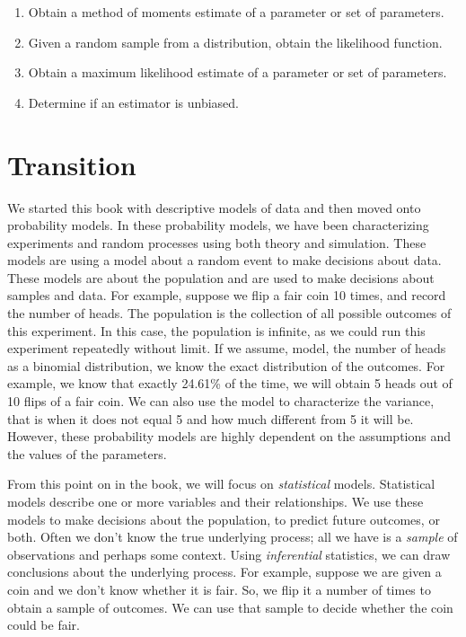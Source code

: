\documentclass[
  letterpaper,
  DIV=11,
  numbers=noendperiod]{scrreprt}
\providecommand{\tightlist}{%
  \setlength{\itemsep}{0pt}\setlength{\parskip}{0pt}}\usepackage{longtable,booktabs,array}
\begin{document}
\begin{enumerate}
\def\labelenumi{\arabic{enumi})}
\tightlist
\item
  Obtain a method of moments estimate of a parameter or set of
  parameters.\\
\item
  Given a random sample from a distribution, obtain the likelihood
  function.\\
\item
  Obtain a maximum likelihood estimate of a parameter or set of
  parameters.\\
\item
  Determine if an estimator is unbiased.
\end{enumerate}

\section{Transition}\label{transition}

We started this book with descriptive models of data and then moved onto
probability models. In these probability models, we have been
characterizing experiments and random processes using both theory and
simulation. These models are using a model about a random event to make
decisions about data. These models are about the population and are used
to make decisions about samples and data. For example, suppose we flip a
fair coin 10 times, and record the number of heads. The population is
the collection of all possible outcomes of this experiment. In this
case, the population is infinite, as we could run this experiment
repeatedly without limit. If we assume, model, the number of heads as a
binomial distribution, we know the exact distribution of the outcomes.
For example, we know that exactly 24.61\% of the time, we will obtain 5
heads out of 10 flips of a fair coin. We can also use the model to
characterize the variance, that is when it does not equal 5 and how much
different from 5 it will be. However, these probability models are
highly dependent on the assumptions and the values of the parameters.

From this point on in the book, we will focus on \emph{statistical}
models. Statistical models describe one or more variables and their
relationships. We use these models to make decisions about the
population, to predict future outcomes, or both. Often we don't know the
true underlying process; all we have is a \emph{sample} of observations
and perhaps some context. Using \emph{inferential} statistics, we can
draw conclusions about the underlying process. For example, suppose we
are given a coin and we don't know whether it is fair. So, we flip it a
number of times to obtain a sample of outcomes. We can use that sample
to decide whether the coin could be fair.
\end{document}
